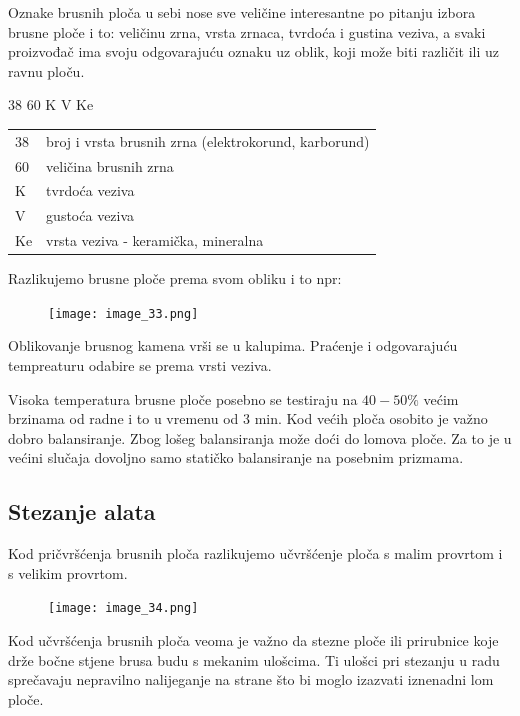 \documentclass[a4paper,12pt]{article}
\numberwithin{figure}{section}
\begin{document}
Oznake brusnih ploča u sebi nose sve veličine interesantne po pitanju izbora brusne ploče i to: veličinu zrna, vrsta zrnaca, tvrdoća i gustina veziva, a svaki proizvođač ima svoju odgovarajuću oznaku uz oblik, koji može biti različit ili uz ravnu ploču.
\begin{center}
38 60 K V Ke
\end{center}
\begin{table}[!h]
\centering
\begin{tabular}{ll}
38 & broj i vrsta brusnih zrna (elektrokorund, karborund) \\
60 & veličina brusnih zrna                                \\
K  & tvrdoća veziva                                       \\
V  & gustoća veziva                                       \\
Ke & vrsta veziva - keramička, mineralna                 
\end{tabular}
\end{table}
\FloatBarrier
Razlikujemo brusne ploče prema svom obliku i to npr:
\begin{figure}[!h]
\centering
\texttt{[image: image\_33.png]}
\end{figure}
\FloatBarrier
Oblikovanje brusnog kamena vrši se u kalupima. Praćenje i odgovarajuću tempreaturu odabire se prema vrsti veziva.\par
Visoka temperatura brusne ploče posebno se testiraju na $40 - 50\%$ većim brzinama od radne i to u vremenu od 3 min. Kod većih ploča osobito je važno dobro balansiranje. Zbog lošeg balansiranja može doći do lomova ploče. Za to je u većini slučaja dovoljno samo statičko balansiranje na posebnim prizmama.
\subsection{Stezanje alata}
Kod pričvršćenja brusnih ploča razlikujemo učvršćenje ploča s malim provrtom i s velikim provrtom.
\begin{figure}[!h]
\centering
\texttt{[image: image\_34.png]}
\end{figure}
\FloatBarrier
Kod učvršćenja brusnih ploča veoma je važno da stezne ploče ili prirubnice koje drže bočne stjene brusa budu s mekanim ulošcima. Ti ulošci pri stezanju u radu sprečavaju nepravilno nalijeganje na strane što bi moglo izazvati iznenadni lom ploče.
\end{document}
